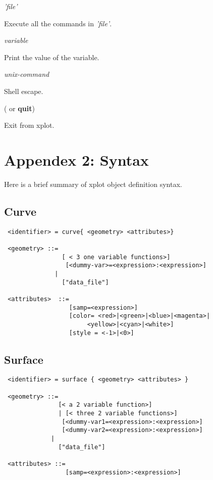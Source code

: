 \vspace{8mm}
 {\it 'file'}

Execute all the commands in {\it 'file'}.

\vspace{8mm}
 {\it variable}

Print the value of the variable.

\vspace{8mm}
\noindent{\bf !}  {\it unix-command}

Shell escape.

\vspace{8mm}
 ( or {\bf quit})

Exit from xplot.

\section{Appendex 2: Syntax}
Here is a brief summary of xplot object definition
syntax.

\subsection*{Curve}
\begin{verbatim}
 <identifier> = curve{ <geometry> <attributes>}

 <geometry> ::= 
                [ < 3 one variable functions>]
                 [<dummy-var>=<expression>:<expression>]
              |
                ["data_file"]

 <attributes>  ::=
                  [samp=<expression>]
                  [color= <red>|<green>|<blue>|<magenta>|
                       <yellow>|<cyan>|<white>]
                  [style = <-1>|<0>]

\end{verbatim}
\subsection*{Surface}
\begin{verbatim}
 <identifier> = surface { <geometry> <attributes> }

 <geometry> ::= 
               [< a 2 variable function>]
               | [< three 2 variable functions>]
                [<dummy-var1=<expression>:<expression>]
                [<dummy-var2=<expression>:<expression>]
             | 
               ["data_file"]

 <attributes> ::=
                 [samp=<expression>:<expression>]
\end{verbatim}

